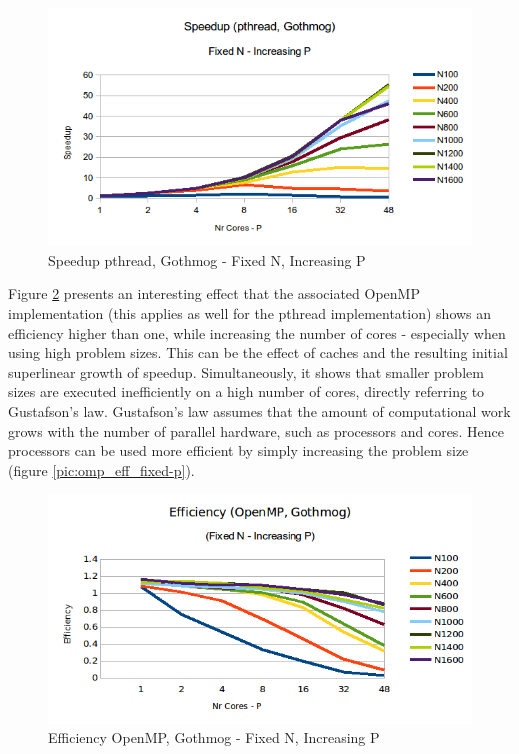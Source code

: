 \documentclass[conference]{IEEEtran}
\begin{document}
\begin{figure}[h]
  \centering
  \includegraphics[scale=0.55]{pic/pthread_gothmog_speedup-fixed-n.png} 
  \caption{Speedup pthread, Gothmog - Fixed N, Increasing P}
  \label{pic:pthread_speedup_fixed-n}
\end{figure}

Figure \ref{pic:omp_efficiency_fixed-n} presents an interesting effect that the associated OpenMP implementation (this applies as well for the pthread implementation) shows an efficiency higher than one, while increasing the number of cores - especially when using high problem sizes. This can be the effect of caches and the resulting initial superlinear growth of speedup. Simultaneously, it shows that smaller problem sizes are executed inefficiently on a high number of cores, directly referring to Gustafson's law. Gustafson's law assumes that the amount of computational work grows with the number of parallel hardware, such as processors and cores. Hence processors can be used more efficient by simply increasing the problem size (figure \ref{pic:omp_eff_fixed-p}). 

\begin{figure}[h]
  \centering
  \includegraphics[scale=0.42]{pic/omp_gothmog_efficiency-fixed-n.png} 
  \caption{Efficiency OpenMP, Gothmog - Fixed N, Increasing P}
  \label{pic:omp_efficiency_fixed-n}
\end{figure}
\end{document}
